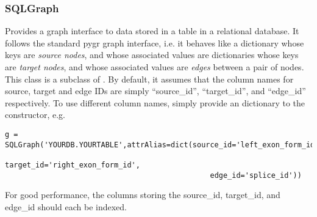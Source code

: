 \documentclass{howto}
\begin{document}
\subsubsection{SQLGraph}
Provides a graph interface to data stored in a table
in a relational database.  It follows the standard pygr 
graph interface, i.e. it behaves like a dictionary whose
keys are {\em source nodes}, and whose associated
values are dictionaries whose keys are {\em target nodes},
and whose associated values are {\em edges} between
a pair of nodes.  This class is a subclass of 
.  By default, it assumes that
the column names for source, target and edge IDs are simply
``source_id'', ``target_id'', and ``edge_id'' respectively.
To use different column names, simply provide an 
dictionary to the constructor, e.g.
\begin{verbatim}
g = SQLGraph('YOURDB.YOURTABLE',attrAlias=dict(source_id='left_exon_form_id',
                                               target_id='right_exon_form_id',
                                               edge_id='splice_id'))
\end{verbatim}
For good performance, the columns storing the source_id, target_id,
and edge_id should each be indexed.
\end{document}
